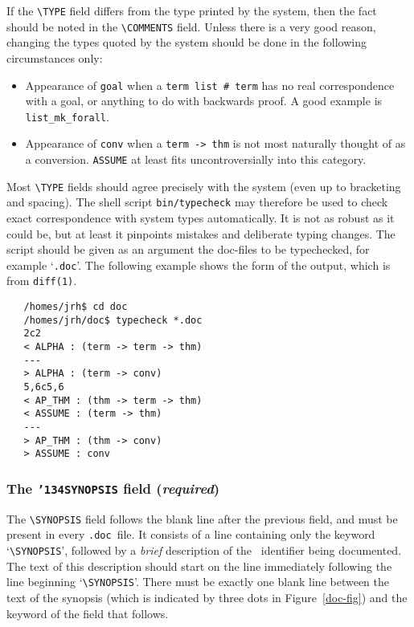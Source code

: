 \documentclass[12pt]{article}
\def\doc{{\tt .doc}}
\begin{document}
If the {\small\verb!\TYPE!} field differs from the type printed by the system,
then the fact should be noted in the {\small\verb!\COMMENTS!} field.  Unless
there is a very good reason, changing the types quoted by the system should be
done in the following circumstances only:

\begin{itemize}
  \item Appearance of {\small\verb!goal!} when a
        {\small\verb!term list # term!} has no real
        correspondence with a goal, or anything to do with backwards
        proof. A good example is {\small\verb!list_mk_forall!}.
  \item Appearance of {\small\verb!conv!} when a {\small\verb!term -> thm!} is
        not most
        naturally thought of as a conversion. {\small\verb!ASSUME!} at
        least fits uncontroversially into this category.
\end{itemize}

Most {\small\verb!\TYPE!} fields should agree precisely with the system
(even up to bracketing and spacing). The shell script
{\small\verb!bin/typecheck!} may therefore be used
to check exact correspondence with system types automatically. It is not as
robust as it could be, but at least it pinpoints mistakes and deliberate typing
changes.  The script should be given as an argument the doc-files to be
typechecked, for example `{\tt *.doc}'. The following example shows the form of
the output, which is from {\tt diff(1)}.

{\small \begin{verbatim}
   /homes/jrh$ cd doc
   /homes/jrh/doc$ typecheck *.doc
   2c2
   < ALPHA : (term -> term -> thm)
   ---
   > ALPHA : (term -> conv)
   5,6c5,6
   < AP_THM : (thm -> term -> thm)
   < ASSUME : (term -> thm)
   ---
   > AP_THM : (thm -> conv)
   > ASSUME : conv
\end{verbatim}}

\subsubsection{The {\tt {\char'134}SYNOPSIS} field ({\it required})}

The {\small\verb!\SYNOPSIS!} field follows the blank line after the
previous field, and must be present in every \doc\ file.  It
consists of a line containing only the keyword `{\small\verb!\SYNOPSIS!}',
followed by a {\it brief\/} description of the \ML\ identifier being
documented. The text of this description should start on the line immediately
following the line beginning `{\small\verb!\SYNOPSIS!}'.  There must be
exactly one blank line between the text of the synopsis (which is indicated by
three dots in Figure~\ref{doc-fig}) and the keyword of the field that
follows.
\end{document}
